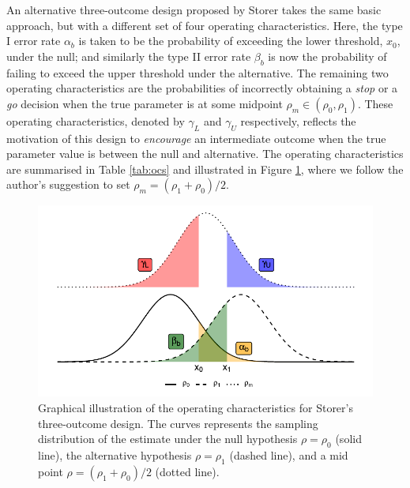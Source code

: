 \documentclass{bmcart}
\begin{document}
An alternative three-outcome design proposed by Storer \cite{Storer1992} takes the same basic approach, but with a different set of four operating characteristics. Here, the type I error rate $\alpha_b$ is taken to be the probability of exceeding the lower threshold, $x_0$, under the null; and similarly the type II error rate $\beta_b$ is now the probability of failing to exceed the upper threshold under the alternative. The remaining two operating characteristics are the probabilities of incorrectly obtaining a \emph{stop} or a \emph{go} decision when the true parameter is at some midpoint $\rho_m \in (\rho_0, \rho_1)$. These operating characteristics, denoted by $\gamma_L$ and $\gamma_U$ respectively, reflects the motivation of this design to \emph{encourage} an intermediate outcome when the true parameter value is between the null and alternative. The operating characteristics are summarised in Table \ref{tab:ocs} and illustrated in Figure \ref{fig:Stor_ocs}, where we follow the author's suggestion to set $\rho_m = (\rho_1 + \rho_0)/2$.

\begin{figure}
\centering
\includegraphics[scale=0.8]{./figures/Stor_ocs}
\caption{Graphical illustration of the operating characteristics for Storer's three-outcome design\cite{Storer1992}. The curves represents the sampling distribution of the estimate under the null hypothesis $\rho = \rho_0$ (solid line), the alternative hypothesis $\rho = \rho_1$ (dashed line), and a mid point $\rho = (\rho_1 + \rho_0)/2$ (dotted line).}
\label{fig:Stor_ocs}
\end{figure}
\end{document}
